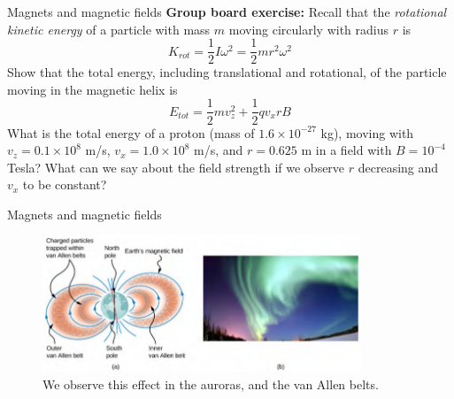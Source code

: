 \documentclass{beamer}
\begin{document}
\begin{frame}{Magnets and magnetic fields}
\small
\textbf{Group board exercise:} Recall that the \textit{rotational kinetic energy} of a particle with mass $m$ moving circularly with radius $r$ is
\begin{equation}
K_{rot} = \frac{1}{2}I\omega^2 = \frac{1}{2}mr^2\omega^2
\end{equation}
Show that the \alert{total energy}, including translational and rotational, of the particle moving in the magnetic helix is
\begin{equation}
E_{tot} = \frac{1}{2}m v_z^2 + \frac{1}{2} q v_x r B
\end{equation}
What is the total energy of a proton (mass of $1.6 \times 10^{-27}$ kg), moving with $v_z = 0.1\times 10^{8}$ m/s, $v_x = 1.0 \times 10^{8}$ m/s, and $r = 0.625$ m in a field with $B = 10^{-4}$ Tesla?  What can we say about the field strength if we observe $r$ decreasing and $v_x$ to be constant?
\end{frame}

\begin{frame}{Magnets and magnetic fields}
\begin{figure}
\centering
\includegraphics[width=0.85\textwidth]{figures/borealis.png}
\caption{\label{fig:borealis} We observe this effect in the auroras, and the van Allen belts.}
\end{figure}
\end{frame}
\end{document}
